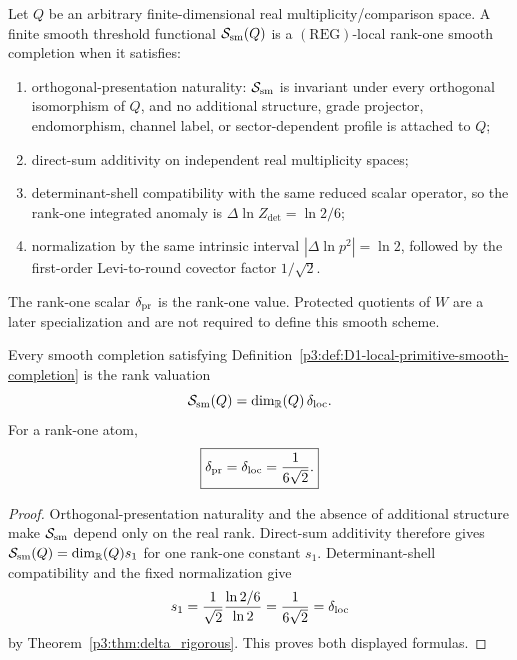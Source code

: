 \documentclass[12pt,a4paper]{article}
\begin{document}
\begin{definition}
\label{p3:def:D1-local-primitive-smooth-completion}
Let \(Q\) be an arbitrary finite-dimensional real multiplicity/comparison
space.  A finite smooth threshold functional \(\mathcal S_{\rm sm}(Q)\) is a
\((\mathrm{REG})\)-local rank-one smooth completion when it satisfies:
\begin{enumerate}[label=(\roman*),leftmargin=2.1em]
\item orthogonal-presentation naturality: \(\mathcal S_{\rm sm}\) is invariant
under every orthogonal isomorphism of \(Q\), and no additional structure,
grade projector, endomorphism, channel label, or sector-dependent profile is
attached to \(Q\);
\item direct-sum additivity on independent real multiplicity spaces;
\item determinant-shell compatibility with the same reduced scalar operator,
so the rank-one integrated anomaly is \(\Delta\ln Z_{\det}=\ln2/6\);
\item normalization by the same intrinsic interval
\(|\Delta\ln p^2|=\ln2\), followed by the first-order Levi-to-round covector
factor \(1/\sqrt2\).
\end{enumerate}
The rank-one scalar \(\delta_{\rm pr}\) is the rank-one value.  Protected
quotients of \(W\) are a later specialization and are not required to define
this smooth scheme.
\end{definition}

\begin{theorem}
\label{p3:thm:D1-primitive-smooth-uniqueness}
Every smooth completion satisfying
Definition~\ref{p3:def:D1-local-primitive-smooth-completion} is the rank
valuation
\begin{equation}
\label{p3:eq:D1-smooth-completion-rank-valuation}
 \mathcal S_{\rm sm}(Q)
 =\dim_{\mathbb R}(Q)\,\delta_{\rm loc}.
\end{equation}
For a rank-one atom,
\begin{equation}
\label{p3:eq:delta-pr-equals-loc-D1}
 \boxed{\delta_{\rm pr}=\delta_{\rm loc}=\frac1{6\sqrt2}.}
\end{equation}
\end{theorem}

\begin{proof}
Orthogonal-presentation naturality and the absence of additional structure make
\(\mathcal S_{\rm sm}\) depend only on the real rank.  Direct-sum additivity therefore gives
\(\mathcal S_{\rm sm}(Q)=\dim_{\mathbb R}(Q)s_1\) for one rank-one constant
\(s_1\).  Determinant-shell compatibility and the fixed normalization give
\[
 s_1
 =\frac1{\sqrt2}\frac{\ln2/6}{\ln2}
 =\frac1{6\sqrt2}
 =\delta_{\rm loc}
\]
by Theorem~\ref{p3:thm:delta_rigorous}.  This proves both displayed formulas.
\end{proof}
\end{document}

